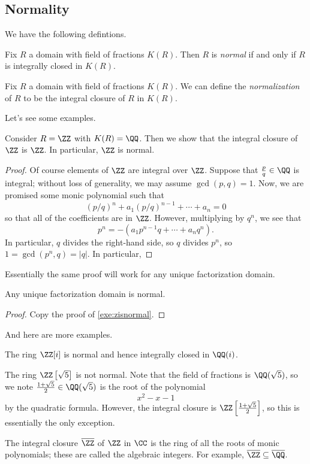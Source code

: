 \subsection{Normality}
We have the following defintions.
\begin{definition}[Normal]
	Fix $R$ a domain with field of fractions $K(R)$. Then $R$ is \textit{normal} if and only if $R$ is integrally closed in $K(R)$.
\end{definition}
\begin{definition}[Normalization]
	Fix $R$ a domain with field of fractions $K(R)$. We can define the \textit{normalization} of $R$ to be the integral closure of $R$ in $K(R)$.
\end{definition}
Let's see some examples.
\begin{exe} \label{exe:zisnormal}
	Consider $R=\ZZ$ with $K(R)=\QQ$. Then we show that the integral closure of $\ZZ$ is $\ZZ$. In particular, $\ZZ$ is normal.
\end{exe}
\begin{proof}
	Of course elements of $\ZZ$ are integral over $\ZZ$. Suppose that $\frac pq\in\QQ$ is integral; without loss of generality, we may assume $\gcd(p,q)=1$. Now, we are promised some monic polynomial such that
	\[(p/q)^n+a_1(p/q)^{n-1}+\cdots+a_n=0\]
	so that all of the coefficients are in $\ZZ$. However, multiplying by $q^n$, we see that
	\[p^n=-\left(a_1p^{n-1}q+\cdots+a_nq^n\right).\]
	In particular, $q$ divides the right-hand side, so $q$ divides $p^n$, so $1=\gcd(p^n,q)=|q|$. In particular, 
\end{proof}
Essentially the same proof will work for any unique factorization domain.
\begin{proposition}
	Any unique factorization domain is normal.
\end{proposition}
\begin{proof}
	Copy the proof of \autoref{exe:zisnormal}.
\end{proof}
And here are more examples.
\begin{example}
	The ring $\ZZ[i]$ is normal and hence integrally closed in $\QQ(i)$.
\end{example}
\begin{nex}
	The ring $\ZZ\left[\sqrt5\right]$ is not normal. Note that the field of fractions is $\QQ(\sqrt5)$, so we note $\frac{1+\sqrt5}2\in\QQ(\sqrt5)$ is the root of the polynomial
	\[x^2-x-1\]
	by the quadratic formula. However, the integral closure is $\ZZ\left[\frac{1+\sqrt5}2\right]$, so this is essentially the only exception.
\end{nex}
\begin{example}
	The integral closure $\overline\ZZ$ of $\ZZ$ in $\CC$ is the ring of all the roots of monic polynomials; these are called the algebraic integers. For example, $\overline\ZZ\subseteq\overline\QQ$.
\end{example}

